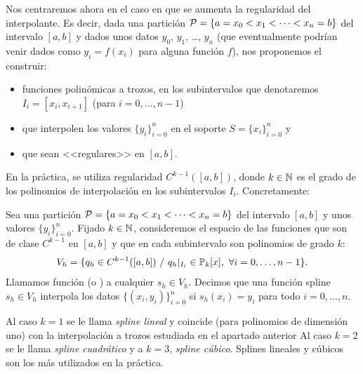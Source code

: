 Nos centraremos ahora en
el caso en que se aumenta la regularidad del interpolante.
Es decir, dada una partición
${\cal P}= \{a = x_0 <x_1 < \cdots <x_n=b\}$
del intervalo $[a,b]$ y dados unos datos $y_0$, $y_1$, \dots, $y_n$
(que eventualmente podrían venir dados como $y_i=f(x_i)$ para alguna
función $f$), nos proponemos el construir:
\begin{itemize}
\item  funciones polinómicas a trozos, en los subintervalos que
  denotaremos $I_i=[x_{i},x_{i+1}]$ (para $ i=0,\dots,n-1$)
\item que interpolen los valores $\{y_i\}_{i=0}^n$ en el soporte
  $S=\{x_i\}_{i=0}^n$ y
\item que sean <<regulares>> en $[a,b]$.
\end{itemize}
En la práctica, se utiliza regularidad $C^{k-1}([a,b])$, donde
$k\in\operatorname{{\mathbb N}}$ es el grado de los polinomios de
interpolación en los subintervalos $I_i$. Concretamente:

\begin{definition}
  \label{def:funcion-spline}
  Sea una partición ${\cal P}= \{a = x_0 <x_1 < \cdots <x_n=b\}$ del
  intervalo $[a,b]$ y unos valores $\{y_i\}_{i=0}^n$. Fijado
  $k\in\operatorname{{\mathbb N}}$, consideremos el espacio de las funciones que son
  de clase $C^{k-1}$ en $[a,b]$ y que en cada subintervalo son
  polinomios de grado $k$:
  \begin{equation*}
    V_h = \{q_h \in C^{k-1}([a,b])\ / \ q_h|_{I_i}\in  \Pol_k[x],\ \forall i=0,\dots,n-1\}.
  \end{equation*}
  Llamamos función  (o ) a
  cualquier $s_h\in V_h$. Decimos que una función spline $s_h\in V_h$
  interpola los datos $\{(x_i,y_i)\}_{i=0}^n$ si $s_h(x_i)=y_i$ para
  todo $i=0,\dots,n$.
\end{definition}

Al caso $k=1$ se le llama \textit{spline lineal} y coincide (para
polinomios de dimensión uno) con la interpolación a trozos estudiada
en el apartado anterior Al caso $k=2$ se le llama \textit{spline
  cuadrático} y a $k=3$, \textit{spline cúbico}. Splines lineales y
cúbicos son los más utilizados en la práctica.

